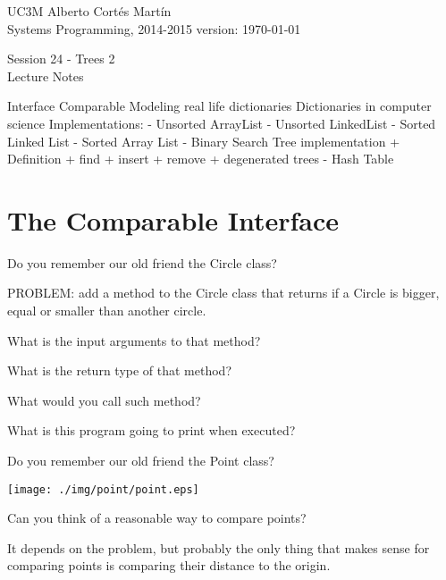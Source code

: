 \documentclass[a4paper, 9pt]{extarticle}
\newcommand{\realtitle}{Session 24 - Trees 2}
\newcommand{\separator}{\begin{center}%
\noindent\makebox[\linewidth]{\rule{0.75\paperwidth}{0.4pt}}%
\end{center}}
\begin{document}
\makebox[\linewidth]{\rule{\textwidth}{0.4pt}}
UC3M \hfill Alberto Cortés Martín\\
Systems Programming, 2014-2015 \hfill version: \today\\
\makebox[\linewidth]{\rule{\textwidth}{0.4pt}}
\begin{center}
  \Large{\realtitle}\\Lecture Notes
\end{center}
\makebox[\linewidth]{\rule{\textwidth}{0.4pt}}
\vspace{1cm}

\begin{blackboard}
Interface Comparable
Modeling real life dictionaries
Dictionaries in computer science
Implementations:
 - Unsorted ArrayList
 - Unsorted LinkedList
 - Sorted Linked List
 - Sorted Array List
 - Binary Search Tree implementation
   + Definition
   + find
   + insert
   + remove
   + degenerated trees
 - Hash Table
\end{blackboard}


\section{The Comparable Interface}

Do you remember our old friend the Circle class?


PROBLEM: add a method to the Circle class that returns if a Circle is bigger, equal or smaller than another circle.

What is the input arguments to that method?

What is the return type of that method?

What would you call such method?


What is this program going to print when executed?

\separator

Do you remember our old friend the Point class?

\begin{center}
  \texttt{[image: ./img/point/point.eps]}
\end{center}

Can you think of a reasonable way to compare points?

It depends on the problem, but probably the only thing that makes sense for
comparing points is comparing their distance to the origin.
\end{document}
